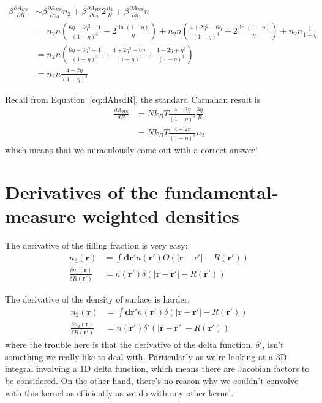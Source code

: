 \documentclass[letterpaper,twocolumn,amsmath,amssymb,prb]{revtex4-1}
\begin{document}
\begin{widetext}
\begin{align}
  \beta \frac{\partial A_{HS}}{\partial R} &\sim
    \beta \frac{\partial A_{HS}}{\partial n_3} n_2 +
    \beta \frac{\partial A_{HS}}{\partial n_2} 2 \frac{n_2}{R} +
    \beta \frac{\partial A_{HS}}{\partial n_1} n
  \\
  &=
    n_2n \left(
      \frac{6\eta - 3\eta^2 - 1}{(1-\eta)^3} -
      2\frac{\ln(1-\eta)}{\eta}
    \right) +
    n_2n \left( \frac{4+2\eta^2-6\eta}{(1-\eta)^3} + 2\frac{\ln(1-\eta)}{\eta} \right) +
    n_2n\frac{1}{1-\eta}
  \\
  &=
    n_2n \left(
      \frac{6\eta - 3\eta^2 - 1}{(1-\eta)^3} +
    \frac{4+2\eta^2-6\eta}{(1-\eta)^3} +
    \frac{1 - 2\eta + \eta^2}{(1-\eta)^3}
  \right)
  \\
  &=
    n_2n \frac{4 - 2\eta}{(1-\eta)^3}
\end{align}
\end{widetext}
Recall from Equation~\ref{eq:dAhsdR}, the standard Carnahan result is
\begin{align}
  \frac{dA_{HS}}{dR}
  &= Nk_BT \frac{4 - 2\eta}{(1-\eta)^3} \frac{3 \eta}{R}
  \\ &= Nk_BT \frac{4 - 2\eta}{(1-\eta)^3} n_2
\end{align}
which means that we miraculously come out with a correct answer!

\section{Derivatives of the fundamental-measure weighted densities}

The derivative of the filling fraction is very easy:
\begin{align}
  n_3(\mathbf{r}) &= \int \mathbf{dr'} n(\mathbf{r'})
  \Theta(|\mathbf{r}-\mathbf{r'}| - R(\mathbf{r'})) \\
  \frac{\delta n_3(\mathbf{r})}{\delta R(\mathbf{r}')}
  &= n(\mathbf{r'})\delta(|\mathbf{r}-\mathbf{r'}| - R(\mathbf{r'}))
\end{align}

The derivative of the density of surface is harder:
\begin{align}
  n_2(\mathbf{r}) &= \int \mathbf{dr'} n(\mathbf{r'})
  \delta(|\mathbf{r}-\mathbf{r'}| - R(\mathbf{r'})) \\
  \frac{\delta n_2(\mathbf{r})}{\delta R(\mathbf{r}')}
  &= n(\mathbf{r'})\delta'(|\mathbf{r}-\mathbf{r'}| - R(\mathbf{r'}))
\end{align}
where the trouble here is that the derivative of the delta function,
$\delta'$, isn't something we really like to deal with.  Particularly
as we're looking  at a 3D integral involving a 1D delta function,
which means there are Jacobian factors to be considered.  On the other
hand, there's no reason why we couldn't convolve with this kernel as
efficiently as we do with any other kernel.
\end{document}
